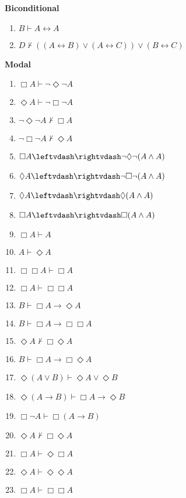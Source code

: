 \begin{singlespace}
\noindent \textbf{Biconditional}

\begin{enumerate}
\setcounter{enumi}{\value{enumi_saved}}
\item $ B\vdash  A \leftrightarrow  A $\hfill\emph{ }  
\item $ D\nvdash  ((A \leftrightarrow  B) \vee  (A \leftrightarrow  C)) \vee  (B \leftrightarrow  C) $\hfill\emph{ }  
\setcounter{enumi_saved}{\value{enumi}}
\end{enumerate}


\noindent \textbf{Modal}

\begin{enumerate}
\setcounter{enumi}{\value{enumi_saved}}
\item $ \Box A\vdash  \neg \Diamond \neg A $\hfill\emph{ }  
\item $ \Diamond A\vdash  \neg \Box \neg A $\hfill\emph{ }  
\item $ \neg \Diamond \neg A\nvdash  \Box A $\hfill\emph{ }  
\item $ \neg \Box \neg A\nvdash  \Diamond A $\hfill\emph{ }  
\item $ \Box A\leftvdash\rightvdash  \neg \Diamond \neg (A \wedge  A) $ \hfill\emph{ }  
\item $ \Diamond A\leftvdash\rightvdash  \neg \Box \neg (A \wedge  A) $ \hfill\emph{ }  
\item $ \Diamond A\leftvdash\rightvdash  \Diamond (A \wedge  A) $ \hfill\emph{ }  
\item $ \Box A\leftvdash\rightvdash  \Box (A \wedge  A) $ \hfill\emph{ }  
\item $ \Box A\vdash  A $\hfill\emph{ }  
\item $ A\vdash  \Diamond A $\hfill\emph{ }  
\item $ \Box \Box A\vdash  \Box A $\hfill\emph{ }  
\item $ \Box A\vdash  \Box \Box A $\hfill\emph{ }  
\item $ B\vdash  \Box A \rightarrow  \Diamond A $\hfill\emph{ }  
\item $ B\vdash  \Box A \rightarrow  \Box \Box A $\hfill\emph{ }  
\item $ \Diamond A\nvdash  \Box \Diamond A $\hfill\emph{ }  
\item $ B\vdash  \Box A \rightarrow  \Box \Diamond A $\hfill\emph{ }  
\item $ \Diamond (A \vee  B)\vdash  \Diamond A \vee  \Diamond B $\hfill\emph{ }  
\item $ \Diamond (A \rightarrow  B)\vdash  \Box A \rightarrow  \Diamond B $\hfill\emph{ }  
\item $ \Box \neg A\vdash  \Box (A \rightarrow  B) $\hfill\emph{ }  
\item $ \Diamond A\nvdash  \Box \Diamond A $\hfill\emph{ }  
\item $ \Box A\vdash  \Diamond \Box A $\hfill\emph{ }  
\item $ \Diamond A\vdash  \Diamond \Diamond A $\hfill\emph{ }  
\item $ \Box A\vdash  \Box \Box A $\hfill\emph{ }  
\setcounter{enumi_saved}{\value{enumi}}
\end{enumerate}
\end{singlespace}

%
%
%